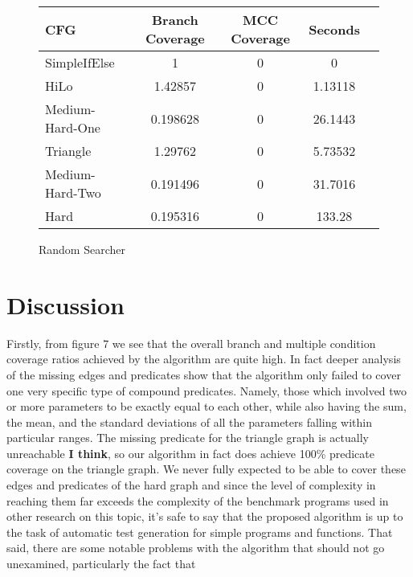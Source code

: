 \documentclass[runningheads]{llncs}
\begin{document}
\begin{figure}[h!]
\begin{center}
	\begin{tabular}{| l | c | c | c | c |}
		\hline
		CFG & Branch Coverage & MCC Coverage & Seconds \\ \hline
		SimpleIfElse & 1 & 0 & 0 \\ \hline
		HiLo & 1.42857 & 0 & 1.13118 \\ \hline
		Medium-Hard-One & 0.198628 & 0 & 26.1443 \\ \hline
		Triangle & 1.29762 & 0 & 5.73532 \\ \hline
		Medium-Hard-Two & 0.191496 & 0 & 31.7016 \\ \hline
		Hard & 0.195316 & 0 & 133.28 \\ \hline
	\end{tabular}
\end{center}

\caption{Random Searcher \label{fig:finalResultRandomSearcher}}
\end{figure}

\FloatBarrier
\newpage
\section{Discussion}
Firstly, from figure 7 we see that the overall branch and multiple condition coverage ratios achieved by the algorithm are quite high. In fact deeper analysis of the missing edges and predicates show that the algorithm only failed to cover one very specific type of compound predicates. Namely, those which involved two or more parameters to be exactly equal to each other, while also having the sum, the mean, and the standard deviations of all the parameters falling within particular ranges. The missing predicate for the triangle graph is actually unreachable \textbf{I think}, so our algorithm in fact does achieve 100\% predicate coverage on the triangle graph. We never fully expected to be able to cover these edges and predicates of the hard graph and since the level of complexity in reaching them far exceeds the complexity of the benchmark programs used in other research on this topic, it's safe to say that the proposed algorithm is up to the task of automatic test generation for simple programs and functions. That said, there are some notable problems with the algorithm that should not go unexamined, particularly the fact that 
\end{document}
